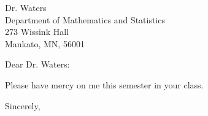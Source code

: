 \documentclass[12pt]{letter}
\begin{document}


\begin{letter}  %
{Dr. Waters \\
Department of Mathematics and Statistics \\
273 Wissink Hall\\  
Mankato, MN, 56001}



\vspace*{-2.45in}
\opening{Dear Dr. Waters:} %

Please have mercy on me this semester in your class.


\vspace{20em}



\vspace*{0.4in}

\vspace*{-1.1in}

\closing{Sincerely,} %
\vspace*{-1ex}


\end{letter}
\end{document}
